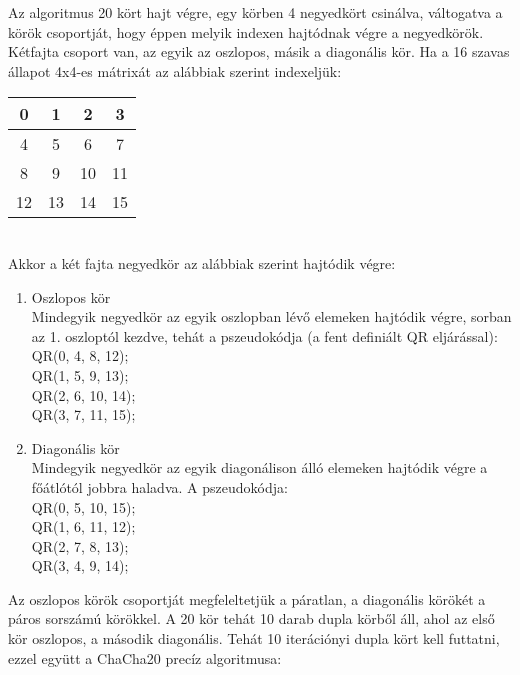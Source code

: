 \documentclass[12pt]{article}
\begin{document}
	Az algoritmus 20 kört hajt végre, egy körben 4 negyedkört csinálva, váltogatva a körök csoportját, hogy éppen melyik indexen hajtódnak végre a negyedkörök. Kétfajta csoport van, az egyik az oszlopos, másik a diagonális kör. Ha a 16 szavas állapot 4x4-es mátrixát az alábbiak szerint indexeljük:
	\begin{table}
		[h]
		\centering
		\begin{tabular}{|c|c|c|c|}
			\hline
			0&1&2&3\\\hline
			4&5&6&7\\\hline
			8&9&10&11\\\hline
			12&13&14&15 \\\hline
		\end{tabular}
	\end{table}
	\\
	Akkor a két fajta negyedkör az alábbiak szerint hajtódik végre:
	\begin{enumerate}
		\bfseries\item Oszlopos kör \\
		\normalfont Mindegyik negyedkör az egyik oszlopban lévő elemeken hajtódik végre, sorban az 1. oszloptól kezdve, tehát a pszeudokódja (a fent definiált QR eljárással):
		\\QR(0, 4, 8, 12); \\
		QR(1, 5, 9, 13); \\
		QR(2, 6, 10, 14); \\
		QR(3, 7, 11, 15);
		\bfseries \item Diagonális kör \\
		\normalfont Mindegyik negyedkör az egyik diagonálison álló elemeken hajtódik végre a főátlótól jobbra haladva. A pszeudokódja:
	    \\QR(0, 5, 10, 15); \\
	    QR(1, 6, 11, 12); \\
	    QR(2, 7,  8, 13); \\
	    QR(3, 4,  9, 14); \\
	\end{enumerate}
	Az oszlopos körök csoportját megfeleltetjük a páratlan, a diagonális körökét a páros sorszámú körökkel. A 20 kör tehát 10 darab dupla körből áll, ahol az első kör oszlopos, a második diagonális. Tehát 10 iterációnyi dupla kört kell futtatni, ezzel együtt a ChaCha20 precíz algoritmusa:
\end{document}

